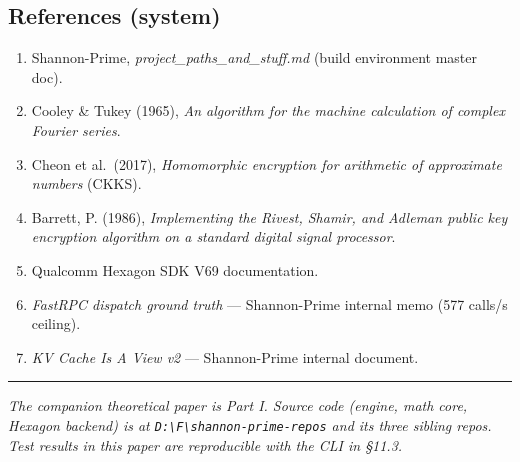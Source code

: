 \documentclass[
  11pt,
]{article}
\providecommand{\tightlist}{%
  \setlength{\itemsep}{0pt}\setlength{\parskip}{0pt}}
\begin{document}
\hypertarget{references-system}{%
\subsection{References (system)}\label{references-system}}

\begin{enumerate}
\def\labelenumi{\arabic{enumi}.}
\tightlist
\item
  Shannon-Prime, \emph{project\_paths\_and\_stuff.md} (build environment
  master doc).
\item
  Cooley \& Tukey (1965), \emph{An algorithm for the machine calculation
  of complex Fourier series}.
\item
  Cheon et al.~(2017), \emph{Homomorphic encryption for arithmetic of
  approximate numbers} (CKKS).
\item
  Barrett, P. (1986), \emph{Implementing the Rivest, Shamir, and Adleman
  public key encryption algorithm on a standard digital signal
  processor}.
\item
  Qualcomm Hexagon SDK V69 documentation.
\item
  \emph{FastRPC dispatch ground truth} --- Shannon-Prime internal memo
  (577 calls/s ceiling).
\item
  \emph{KV Cache Is A View v2} --- Shannon-Prime internal document.
\end{enumerate}

\begin{center}\rule{0.5\linewidth}{0.5pt}\end{center}

\emph{The companion theoretical paper is Part I. Source code (engine,
math core, Hexagon backend) is at
\texttt{D:\textbackslash{}F\textbackslash{}shannon-prime-repos} and its
three sibling repos. Test results in this paper are reproducible with
the CLI in §11.3.}
\end{document}
